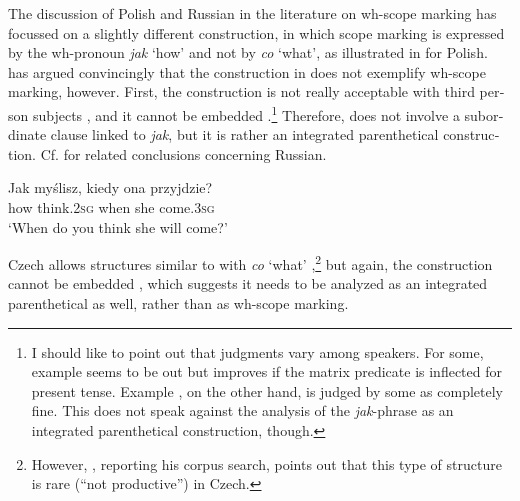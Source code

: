 \documentclass[output=paper,colorlinks,citecolor=brown]{langscibook}
\begin{document}
\begin{otherlanguage}{english}
\noindent The discussion of Polish and Russian in the literature on wh-scope marking has focussed on a slightly different construction, in which scope marking is expressed by the wh-pronoun \textit{jak} ‘how' and not by \textit{co} ‘what', as illustrated in  for Polish. \citet{Lubanska2004} has argued convincingly that the construction in  does not exemplify wh-scope marking, however. First, the construction is not really acceptable with third person subjects , and it cannot be embedded .\footnote{I should like to point out that judgments vary among speakers. For some, example  seems to be out but improves if the matrix predicate is inflected for present tense. Example , on the other hand, is judged by some as completely fine. This does not speak against the analysis of the \textit{jak}-phrase as an integrated parenthetical construction, though.
} Therefore,  does not involve a subordinate clause linked to \textit{jak}, but it is rather an integrated parenthetical construction. Cf. \citet{Korotkova2012} for related conclusions concerning Russian.


\ea\label{ex:fanselow:16}
\ea     
\gll Jak	myślisz,	kiedy 	ona	przyjdzie? \\
    how think.2\textsc{sg} when she come.3\textsc{sg} \\
\glt ‘When do you think she will come?'
\label{ex:fanselow:16a}
\label{ex:fanselow:16b}
\label{ex:fanselow:16c}
\z\z

\noindent Czech allows structures similar to  with \textit{co} ‘what' ,\footnote{However, \citet[195]{Meyer2004}, reporting his corpus search, points out that this type of structure is rare (“not productive”) in Czech.
} but again, the construction cannot be embedded , which suggests it needs to be analyzed as an integrated parenthetical as well, rather than as wh-scope marking.


\end{otherlanguage}
\end{document}
